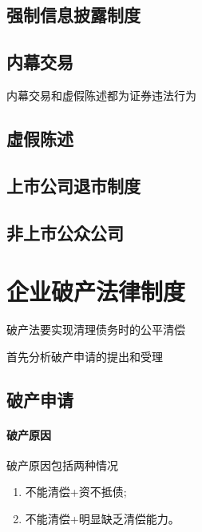 \documentclass[UTF8,12pt]{ctexart}
\numberwithin{equation}{section} %
\numberwithin{figure}{section}
\numberwithin{table}{section}
\begin{document}
	\subsection{强制信息披露制度}
	
	\subsection{内幕交易}
	内幕交易和虚假陈述都为证券违法行为
	
	\subsection{虛假陈述}
	
	\subsection{上市公司退市制度}
	
	\subsection{非上市公众公司}

	
	\newpage


 	\section{企业破产法律制度}
	破产法要实现清理债务时的公平清偿
	
	首先分析破产申请的提出和受理
	
	\subsection{破产申请}
	
	\paragraph{破产原因}
	破产原因包括两种情况
	\begin{enumerate}
		\item 不能清偿+资不抵债;
		
		\item 不能清偿+明显缺乏清偿能力。
	\end{enumerate}
\end{document}
